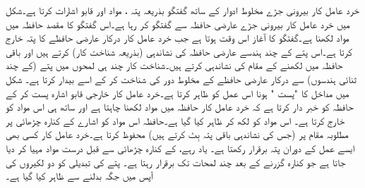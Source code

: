 خرد عامل کار بیرونی جڑے مخلوط ادوار کے ساتھ گفتگو بذریعہ پتہ ، مواد اور قابو اشارات  کرتا ہے۔شکل    میں خرد عامل کار بیرونی جڑے عارضی حافظہ سے گفتگو کر رہا ہے۔اس گفتگو کا مقصد حافظہ میں مواد لکھنا ہے۔گفتگو کا آغاز اس وقت ہوتا ہے جب خرد عامل کار درکار عارضی حافظے کا پتہ خارج کرتا ہے۔اس پتے کے  چند ہندسے عارضی حافظہ کی نشاندہی     (بذریعہ شناخت کار) کرتے ہیں اور باقی حافظہ میں لکھنے کے مقام کی نشاندہی کرتے ہیں۔شناخت کار چند ہی لمحوں میں پتے (کے چند ثنائی ہندسوں) سے درکار عارضی حافظے کے مخلوط دور کی شناخت کر کے اسے بیدار کرتا ہے۔ شکل میں   مداخل   کا   "پست "  ہونا اس عمل کو ظاہر کرتا ہے۔خرد عامل کار خارجی قابو اشارہ  پست کر کے حافظہ کو خبر دار کرتا ہے کہ خرد عامل کار حافظہ میں مواد لکھنا چاہتا ہے اور ساتھ ہی   اس مواد کو خارج کرتا ہے۔ اس مواد کو  لکھ کر ظاہر کیا گیا ہے۔حافظہ اس مواد کو  اشارے کے کنارہ چڑھائی پر مطلوبہ مقام پر (جس کی نشاندہی باقی پتہ بِٹ کرتے ہیں) محفوظ کرتا ہے۔خرد عامل کار کسی بھی ایسے عمل کے دوران پتہ برقرار رکھتا ہے۔  یاد رہے،    کے کنارہ چڑھائی  سے قبل درست مواد  مہیا کر دیا جاتا ہے جو کنارہ گزرنے کے بعد چند لمحات تک برقرار رہتا ہے۔  پتے کی تبدیلی کو دو لکیروں کی آپس میں جگہ بدلنے سے ظاہر کیا گیا ہے۔

